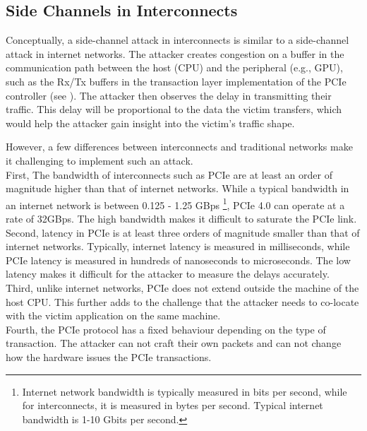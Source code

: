 \subsection{Side Channels in Interconnects}
\label{subsec:interconnect-sc-background-side-channels}

Conceptually, a side-channel attack in interconnects is similar to a side-channel attack in internet networks. 
The attacker creates congestion on a buffer in the communication path between the host (CPU) and the peripheral (e.g., GPU), such as the Rx/Tx buffers in the transaction layer implementation of the PCIe controller (see ).
The attacker then observes the delay in transmitting their traffic.
This delay will be proportional to the data the victim transfers, which would help the attacker gain insight into the victim's traffic shape.

However, a few differences between interconnects and traditional networks make it challenging to implement such an attack. \\
First, The bandwidth of interconnects such as PCIe are at least an order of magnitude higher than that of internet networks.
While a typical bandwidth in an internet network is between 0.125 - 1.25 GBps 
\footnote{Internet network bandwidth is typically measured in bits per second, while for interconnects, it is measured in bytes per second. Typical internet bandwidth is 1-10 Gbits per second.},
PCIe 4.0 can operate at a rate of 32GBps.
The high bandwidth makes it difficult to saturate the PCIe link. \\
Second, latency in PCIe is at least three orders of magnitude smaller than that of internet networks.
Typically, internet latency is measured in milliseconds, while PCIe latency is measured in hundreds of nanoseconds to microseconds.
The low latency makes it difficult for the attacker to measure the delays accurately. \\
Third, unlike internet networks, PCIe does not extend outside the machine of the host CPU.
This further adds to the challenge that the attacker needs to co-locate with the victim application on the same machine. \\
Fourth, the PCIe protocol has a fixed behaviour depending on the type of transaction.
The attacker can not craft their own packets and can not change how the hardware issues the PCIe transactions.


